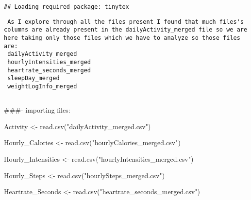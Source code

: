 \documentclass[
]{article}
\newenvironment{Shaded}{\begin{snugshade}}{\end{snugshade}}
\newcommand{\FunctionTok}[1]{\textcolor[rgb]{0.00,0.00,0.00}{#1}}
\newcommand{\NormalTok}[1]{#1}
\newcommand{\OtherTok}[1]{\textcolor[rgb]{0.56,0.35,0.01}{#1}}
\newcommand{\StringTok}[1]{\textcolor[rgb]{0.31,0.60,0.02}{#1}}
\begin{document}
\begin{verbatim}
## Loading required package: tinytex
\end{verbatim}

\begin{verbatim}
 As I explore through all the files present I found that much files's columns are already present in the dailyActivity_merged file so we are here taking only those files which we have to analyze so those files are:
 dailyActivity_merged
 hourlyIntensities_merged
 heartrate_seconds_merged
 sleepDay_merged
 weightLogInfo_merged
 
\end{verbatim}

\#\#\#- importing files:

\begin{Shaded}
\begin{Highlighting}[]
\NormalTok{     Activity }\OtherTok{\textless{}{-}} \FunctionTok{read.csv}\NormalTok{(}\StringTok{"dailyActivity\_merged.csv"}\NormalTok{)}
\end{Highlighting}
\end{Shaded}

\begin{Shaded}
\begin{Highlighting}[]
\NormalTok{Hourly\_Calories }\OtherTok{\textless{}{-}} \FunctionTok{read.csv}\NormalTok{(}\StringTok{"hourlyCalories\_merged.csv"}\NormalTok{)}
\end{Highlighting}
\end{Shaded}

\begin{Shaded}
\begin{Highlighting}[]
\NormalTok{Hourly\_Intensities }\OtherTok{\textless{}{-}} \FunctionTok{read.csv}\NormalTok{(}\StringTok{"hourlyIntensities\_merged.csv"}\NormalTok{)}
\end{Highlighting}
\end{Shaded}

\begin{Shaded}
\begin{Highlighting}[]
\NormalTok{ Hourly\_Steps }\OtherTok{\textless{}{-}} \FunctionTok{read.csv}\NormalTok{(}\StringTok{"hourlySteps\_merged.csv"}\NormalTok{)}
\end{Highlighting}
\end{Shaded}

\begin{Shaded}
\begin{Highlighting}[]
\NormalTok{Heartrate\_Seconds }\OtherTok{\textless{}{-}} \FunctionTok{read.csv}\NormalTok{(}\StringTok{"heartrate\_seconds\_merged.csv"}\NormalTok{)}
\end{Highlighting}
\end{Shaded}
\end{document}
